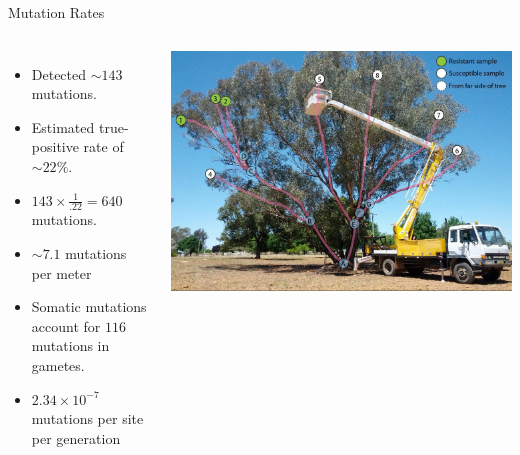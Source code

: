 \documentclass{beamer}
\begin{document}
\begin{frame}{Mutation Rates}
\begin{columns}
\begin{itemize}
\item Detected $\sim143$ mutations.
\item Estimated true-positive rate of $\sim22\%$.
\item $143\times\frac{1}{.22}=640$ mutations.
\item $\sim7.1$ mutations per meter
\item Somatic mutations account for $116$ mutations in gametes.
\item $2.34\times10^{-7}$ mutations per site per generation
\end{itemize}
\includegraphics[width=\linewidth]{labeled_nodes_tree.jpg}
\end{columns}
\end{frame}
\end{document}
